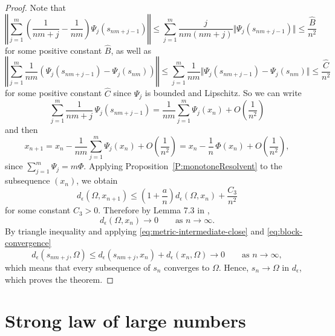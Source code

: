 \documentclass[12pt,reqno]{amsart}
\begin{document}
\begin{proof}
Note that
\begin{displaymath}
\left\Vert \sum_{j=1}^m \left( \frac1{nm+j} - \frac1{nm} \right) \Psi_j(s_{nm+j-1}) \right\Vert
\leq \sum_{j=1}^m \frac{j}{nm(nm+j)} \Vert \Psi_j(s_{nm+j-1}) \Vert
\leq \frac{\hat{B}}{n^{2}}
\end{displaymath}
for some positive constant $\hat{B}$, as well as
\begin{displaymath}
\left\Vert \sum_{j=1}^{m} \frac{1}{nm} \left( \Psi_j(s_{nm+j-1}) - \Psi_j(s_{nm}) \right) \right\Vert
\leq \sum_{j=1}^m \frac{1}{nm} \Vert \Psi_j(s_{nm+j-1}) - \Psi_j(s_{nm}) \Vert
\leq \frac{\hat{C}}{n^{2}}
\end{displaymath}
for some positive constant $\hat{C}$ since $\Psi_{j}$ is bounded and Lipschitz.
So we can write
\begin{displaymath}
\sum_{j=1}^m \frac1{nm+j} \, \Psi_j(s_{nm+j-1}) = \frac1{nm}\sum_{j=1}^m \Psi_j(x_n) + O\!\left(\frac1{n^2}\right)
\end{displaymath}
and then
\begin{equation}\label{eq:block-forward-Euler}
x_{n+1} = x_{n} - \frac1{nm}\sum_{j=1}^m \Psi_j(x_n) + O\!\left(\frac1{n^2}\right)
= x_n - \frac1n \, \Phi(x_n) + O\!\left(\frac1{n^2}\right),
\end{equation}
since $\sum_{j=1}^m \Psi_j = m \Phi$.
Applying Proposition~\ref{P:monotoneResolvent} to the subsequence
\((x_n)\), we obtain
\[
d_\epsilon(\Omega,x_{n+1})
\le
\left( 1 + \frac{a}{n} \right) d_\epsilon(\Omega,x_n) + \frac{C_3}{n^2}
\]
for some constant \( C_3 > 0\). Therefore by Lemma 7.3 in \cite{HallHeyde},
\begin{equation}\label{eq:block-convergence}
d_\epsilon(\Omega,x_n) \longrightarrow 0
\qquad \text{as } n \to \infty.
\end{equation}
By triangle inequality and applying \eqref{eq:metric-intermediate-close} and \eqref{eq:block-convergence}
\begin{displaymath}
d_{\epsilon}(s_{nm+j}, \Omega) \leq d_{\epsilon}(s_{nm+j}, x_{n}) + d_{\epsilon}(x_{n}, \Omega) \longrightarrow 0 \qquad \text{as } n \to \infty,
\end{displaymath}
which means that every subsequence of $s_{n}$ converges to $\Omega$.
Hence, $s_n \to \Omega$ in $d_\epsilon$, which proves the theorem.
\end{proof}



\section{Strong law of large numbers}
\end{document}

